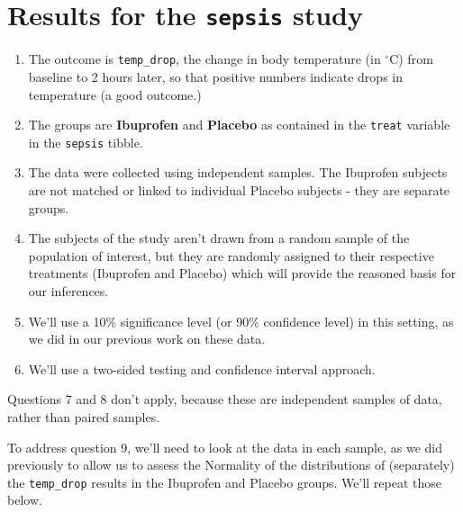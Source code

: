 \documentclass[
]{book}
\providecommand{\tightlist}{%
  \setlength{\itemsep}{0pt}\setlength{\parskip}{0pt}}
\begin{document}
\hypertarget{results-for-the-sepsis-study}{%
\section{\texorpdfstring{Results for the \texttt{sepsis} study}{Results for the sepsis study}}\label{results-for-the-sepsis-study}}

\begin{enumerate}
\def\labelenumi{\arabic{enumi}.}
\tightlist
\item
  The outcome is \texttt{temp\_drop}, the change in body temperature (in \(^{\circ}\)C) from baseline to 2 hours later, so that positive numbers indicate drops in temperature (a good outcome.)
\item
  The groups are \textbf{Ibuprofen} and \textbf{Placebo} as contained in the \texttt{treat} variable in the \texttt{sepsis} tibble.
\item
  The data were collected using independent samples. The Ibuprofen subjects are not matched or linked to individual Placebo subjects - they are separate groups.
\item
  The subjects of the study aren't drawn from a random sample of the population of interest, but they are randomly assigned to their respective treatments (Ibuprofen and Placebo) which will provide the reasoned basis for our inferences.
\item
  We'll use a 10\% significance level (or 90\% confidence level) in this setting, as we did in our previous work on these data.
\item
  We'll use a two-sided testing and confidence interval approach.
\end{enumerate}

Questions 7 and 8 don't apply, because these are independent samples of data, rather than paired samples.

To address question 9, we'll need to look at the data in each sample, as we did previously to allow us to assess the Normality of the distributions of (separately) the \texttt{temp\_drop} results in the Ibuprofen and Placebo groups. We'll repeat those below.
\end{document}
